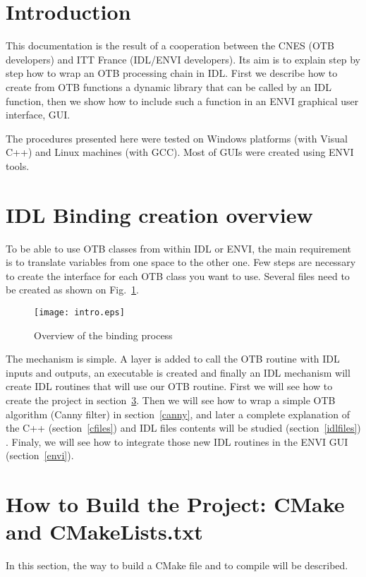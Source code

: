 
\section{Introduction}

This documentation is the result of a cooperation between the CNES
(OTB developers) and ITT France (IDL/ENVI developers). Its aim is to explain step by step how to wrap an OTB processing chain in IDL. First we describe how to create from OTB functions a dynamic library that can be called by an IDL function, then we show how to include such a function in an ENVI graphical user interface, GUI.

The procedures presented here were tested on Windows platforms (with Visual C++) and Linux machines (with GCC). Most of GUIs were created using ENVI tools.

\section{IDL Binding creation overview}

To be able to use OTB classes from within IDL or ENVI, the main requirement is to translate variables from one space to the other one. Few steps are necessary to create the interface for each OTB class you want to use. Several files need to be created as shown on Fig.~\ref{fig:overview}.

\begin{figure}[htp]
     \centering
      \texttt{[image: intro.eps]}
      \caption{Overview of the binding process}\label{fig:overview}
\end{figure}

The mechanism is simple. A layer is added to call the OTB routine with
IDL inputs and outputs, an executable is created and finally an IDL mechanism will create IDL routines that will use our OTB routine.
First we will see how to create the project in section~\ref{buildProject}. Then we will see how to wrap a simple OTB algorithm (Canny filter) in section~\ref{canny}, and later a complete explanation of
the C++ (section~\ref{cfiles}) and IDL files contents will be studied (section~\ref{idlfiles}) . Finaly, we will see how to integrate those new IDL routines in the ENVI GUI (section~\ref{envi}).

\section{How to Build the Project: CMake and CMakeLists.txt}
\label{buildProject}
In this section, the way to build a CMake file and to compile will be
described.

